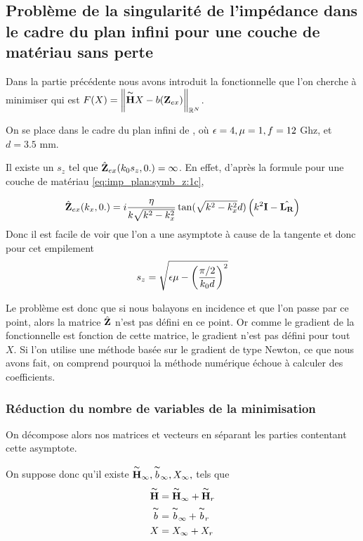 \subsection{Problème de la singularité de l'impédance dans le cadre du plan infini pour une couche de matériau sans perte}

Dans la partie précédente nous avons introduit la fonctionnelle que l'on cherche à minimiser qui est \(F(X) = \left\lVert\overset{\thicksim}{\mathbf{H}} X - b(\mathbf{Z}_{ex})\right\rVert_{\mathbb R^N}\).

On se place dans le cadre du plan infini de \cite{aubakirov_electromagnetic_2014}, où \(\epsilon=4,\mu=1,f=12\) Ghz, et \(d=3.5\) mm. %

Il existe un \(s_z\) tel que \(\hat{\mathbf{Z}}_{ex}(k_0s_z,0.) = \infty\). En effet, d'après la formule pour une couche de matériau \eqref{eq:imp_plan:symb_z:1c}, 

\begin{equation}
  \hat{\mathbf{Z}}_{ex}(k_x,0.) = i\dfrac{\eta}{k\sqrt{k^2 - k_x^2}}\tan(\sqrt{k^2 - k_x^2}d)\left(k^2\mathbf{I} - \hat{\mathbf{L_R}}\right)
\end{equation}
Donc il est facile de voir que l'on a une asymptote à cause de la tangente et donc pour cet empilement
\begin{equation}
  s_z = \sqrt{\epsilon \mu - \left(\dfrac{\pi/2}{k_0 d}\right)^2}
\end{equation}

Le problème est donc que si nous balayons en incidence et que l'on passe par ce point, alors la matrice \(\hat{\mathbf{Z}}\) n'est pas défini en ce point. Or comme le gradient de la fonctionnelle est fonction de cette matrice, le gradient n'est pas défini pour tout \(X\). Si l'on utilise une méthode basée sur le gradient de type Newton, ce que nous avons fait, on comprend pourquoi la méthode numérique échoue à calculer des coefficients.

\subsubsection{Réduction du nombre de variables de la minimisation}

On décompose alors nos matrices et vecteurs en séparant les parties contentant cette asymptote.

On suppose donc qu'il existe \(\overset{\thicksim}{\mathbf{H}}_\infty, \overset{\thicksim}{b}_\infty, X_\infty,\) tels que
\begin{align*}
  \overset{\thicksim}{\mathbf{H}} &= \overset{\thicksim}{\mathbf{H}}_\infty + \overset{\thicksim}{\mathbf{H}}_r
  \\
  \overset{\thicksim}{b} &= \overset{\thicksim}{b}_\infty + \overset{\thicksim}{b}_r
  \\
  X &= X_\infty + X_r
\end{align*}

